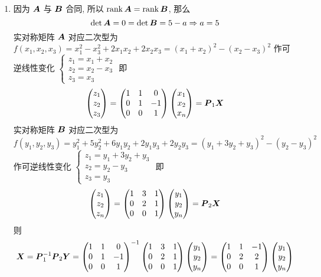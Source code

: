 \begin{solution}
    \begin{enumerate}[label=(\arabic{*})]
        \item 因为 $\vb*{A}$ 与 $\vb*{B}$ 合同, 所以 $\rank\vb*{A}=\rank\vb*{B}$, 那么
        $$\det\vb*{A}=0=\det\vb*{B}=5-a\Rightarrow a=5$$
        实对称矩阵 $\vb*{A}$ 对应二次型为 $f(x_1,x_2,x_3)=x_1^2-x_3^2+2x_1x_2+2x_2x_3=(x_1+x_2)^2-(x_2-x_3)^2$
        作可逆线性变化 $\begin{cases}
            z_1=x_1+x_2\\ z_2=x_2-x_3\\ z_3=x_3
        \end{cases}$ 即 $$\mqty( z_1 \\ z_2 \\ z_3 )=\begin{pmatrix} 1 & 1 & 0 \\ 0 & 1 & -1 \\ 0 & 0 & 1 \\\end{pmatrix}\mqty( x_1 \\ x_2 \\ x_n )=\vb*{P}_1\vb*{X}$$
        实对称矩阵 $\vb*{B}$ 对应二次型为 $f(y_1, y_2, y_3)=y_1^2+5y_2^2+6y_1y_2+2y_1y_3+2y_2y_3=(y_1+3y_2+y_3)^2-(y_2-y_3)^2$ 作可逆线性变化 $\begin{cases}
            z_1=y_1+3y_2+y_3\\ z_2=y_2-y_3\\ z_3=y_3
        \end{cases}$
        即 
        $$
        \mqty( z_1 \\ z_2 \\ z_n )=\begin{pmatrix} 1 & 3 & 1 \\ 0 & 2 & 1 \\ 0 & 0 & 1 \\\end{pmatrix}\mqty( y_1 \\ y_2 \\ y_n )=\vb*{P}_2\vb*{X}
        $$
        则 $$\vb*{X}=\vb*{P}_1^{-1}\vb*{P}_2\vb*{Y}=\begin{pmatrix} 1 & 1 & 0 \\ 0 & 1 & -1 \\ 0 & 0 & 1 \\\end{pmatrix}^{-1}\begin{pmatrix} 1 & 3 & 1 \\ 0 & 2 & 1 \\ 0 & 0 & 1 \\\end{pmatrix}\mqty( y_1 \\ y_2 \\ y_n )=\begin{pmatrix} 1 & 1 & -1 \\ 0 & 2 & 2 \\ 0 & 0 & 1 \\\end{pmatrix}\mqty( y_1 \\ y_2 \\ y_n )$$

\end{enumerate}
\end{solution}
